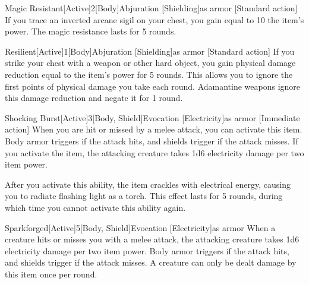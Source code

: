         \begin{magicitemdef}{Magic Resistant}[Active]{2}[Body]{Abjuration [Shielding]}{as armor}
            [Standard action] If you trace an inverted arcane sigil on your chest, you gain  equal to 10 \add the item's power.
            The magic resistance lasts for 5 rounds.
        \end{magicitemdef}

        \begin{magicitemdef}{Resilient}[Active]{1}[Body]{Abjuration [Shielding]}{as armor}
            [Standard action] If you strike your chest with a weapon or other hard object, you gain physical damage reduction equal to the item's power for 5 rounds.
            This allows you to ignore the first points of physical damage you take each round.
            Adamantine weapons ignore this damage reduction and negate it for 1 round.
        \end{magicitemdef}

        \begin{magicitemdef}{Shocking Burst}[Active]{3}[Body, Shield]{Evocation [Electricity]}{as armor}
            [Immediate action] When you are hit or missed by a melee attack, you can activate this item.
            Body armor triggers if the attack hits, and shields trigger if the attack misses.
            If you activate the item, the attacking creature takes 1d6 electricity damage per two item power.

            After you activate this ability, the item crackles with electrical energy, causing you to radiate flashing light as a torch.
            This effect lasts for 5 rounds, during which time you cannot activate this ability again.
        \end{magicitemdef}

        \begin{magicitemdef}{Sparkforged}[Active]{5}[Body, Shield]{Evocation [Electricity]}{as armor}
             When a creature hits or misses you with a melee attack, the attacking creature takes 1d6 electricity damage per two item power.
            Body armor triggers if the attack hits, and shields trigger if the attack misses.
            A creature can only be dealt damage by this item once per round.
        \end{magicitemdef}

